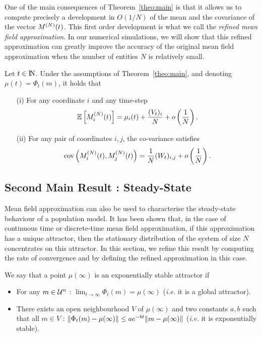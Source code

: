 \documentclass{amsart}
\begin{document}
One of the main consequences of Theorem~\ref{theo:main} is that it
allows us to compute precisely a development in $O(1/N)$ of the mean
and the covariance of the vector $M^{(N)}(t)$. This first order
development is what we call the \emph{refined mean field
  approximation}. In our numerical simulations, we will show that this
refined approximation can greatly improve the accuracy of the original
mean field approximation when the number of entities $N$ is relatively small.
\begin{coro}
  \label{coro:main}
  Let $t\in\mathrm{I\!N}$. Under the assumptions of Theorem~\ref{theo:main},
  and denoting $\mu(t)=\Phi_t(m)$, it holds that
  \begin{itemize}
  \item[(i)] For any coordinate $i$ and any time-step
    \begin{align*}
      \esp{\MN_i(t)} = \mu_i(t) + \frac{(V_{t})_i}{N} +  o\p{\frac1N}.
    \end{align*}
  \item[(ii)] For any pair of coordinates $i,j$, the co-variance satisfies
    \begin{align*}
      \mathrm{cov}\left(M^{(N)}_i(t),M^{(N)}_j(t)\right) = \frac1N(W_{t})_{i,j} + o\left(\frac1N\right). 
    \end{align*}
  \end{itemize}
\end{coro}

\subsection{Second Main Result : Steady-State}
\label{ssec:steady}

Mean field approximation can also be used to characterise the
steady-state behaviour of a population model. It has been shown that,
in the case of continuous time or discrete-time mean field
approximation, if this approximation has a unique attractor, then the
stationary distribution of the system of size $N$ concentrates on this
attractor. In this section, we refine this result by computing the
rate of convergence and by defining the refined approximation in this
case.

We say that a point $\mu(\infty)$ is an exponentially stable attractor
if
\begin{itemize}
\item For any $m\in\mathcal{U}^n$ : $\lim_{t\to\infty}\Phi_t(m)=\mu(\infty)$
  (\emph{i.e.} it is a global attractor).
\item There exists an open neighbourhood $V$ of $\mu(\infty)$ and two
  constants $a,b$ such that all $m\in V$ :
  $\norm{\Phi_t(m)-\mu(\infty)}\le a e^{-bt}\norm{m-\mu(\infty)}$
  (\emph{i.e.}  it is exponentially stable).
\end{itemize}
\end{document}
